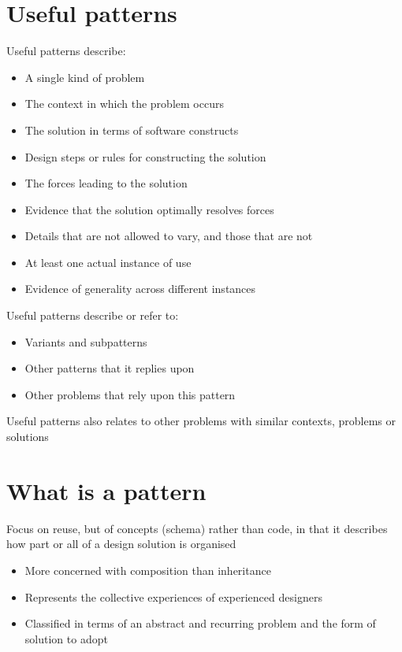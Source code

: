 \documentclass{article}[18pt]
\begin{document}
\section{Useful patterns}
Useful patterns describe:
\begin{itemize}
	\item A single kind of problem
	\item The context in which the problem occurs
	\item The solution in terms of software constructs
	\item Design steps or rules for constructing the solution
	\item The forces leading to the solution
	\item Evidence that the solution optimally resolves forces
	\item Details that are not allowed to vary, and those that are not
	\item At least one actual instance of use
	\item Evidence of generality across different instances
\end{itemize}
Useful patterns describe or refer to:
\begin{itemize}
	\item Variants and subpatterns
	\item Other patterns that it replies upon
	\item Other problems that rely upon this pattern
\end{itemize}
Useful patterns also relates to other problems with similar contexts, problems or solutions
\section{What is a pattern}
Focus on reuse, but of concepts (schema) rather than code, in that it describes how part or all of a design solution is organised
\begin{itemize}
	\item More concerned with composition than inheritance
	\item Represents the collective experiences of experienced designers
	\item Classified in terms of an abstract and recurring problem and the form of solution to adopt
\end{itemize}
\end{document}
